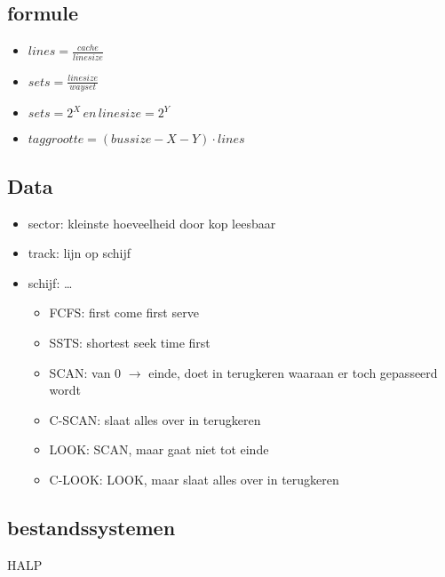 \documentclass[11pt]{article}
\let\originalitem\item
\renewcommand{\item}{\originalitem[]}
\newcommand{\Newpage}{\end{preview}\begin{preview}}
\begin{document}
\begin{preview}
\subsection{formule}
\begin{itemize}
	\item $lines = \frac{cache}{linesize}$
	\item $sets = \frac{linesize}{wayset}$
	\item $sets = 2^X \, en \, linesize = 2^Y$
	\item $taggrootte = (bussize - X - Y) \cdot lines$
\end{itemize}


\Newpage

\section{Data}

\begin{itemize}
	\item sector: kleinste hoeveelheid door kop leesbaar
	\item track: lijn op schijf
	\item schijf: \dots
	\begin{itemize}
		\item FCFS: first come first serve
		\item SSTS: shortest seek time first
		\item SCAN: van 0 $\rightarrow$ einde, doet in terugkeren waaraan er toch gepasseerd wordt
		\item C-SCAN: slaat alles over in terugkeren
		\item LOOK: SCAN, maar gaat niet tot einde
		\item C-LOOK: LOOK, maar slaat alles over in terugkeren
	\end{itemize}
\end{itemize}

\subsection{bestandssystemen}

HALP %

\end{preview}
\end{document}
